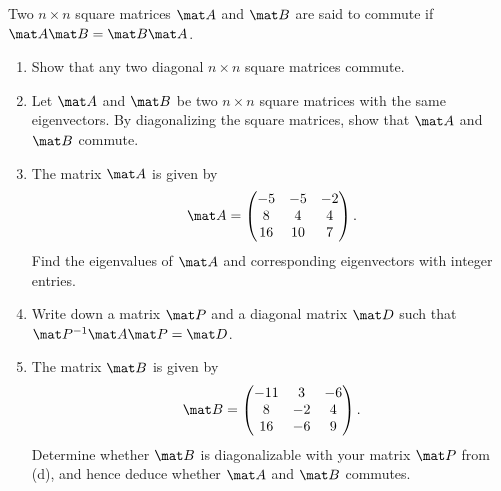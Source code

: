 \clearpage
\begin{problem}
    Two $n \times n$ square matrices $\mat A$ and $\mat B$ are said to commute if $\mat A \mat B = \mat B \mat A$.

    \begin{enumerate}
        \item Show that any two diagonal $n \times n$ square matrices commute.
        \item Let $\mat A$ and $\mat B$ be two $n \times n$ square matrices with the same eigenvectors. By diagonalizing the square matrices, show that $\mat A$ and $\mat B$ commute.
        \item The matrix $\mat A$ is given by \[\mat A = \begin{pmatrix}-5 & -5 & -2 \\ 8 & 4 & 4 \\ 16 & 10 & 7\end{pmatrix}.\] Find the eigenvalues of $\mat A$ and corresponding eigenvectors with integer entries.
        \item Write down a matrix $\mat P$ and a diagonal matrix $\mat D$ such that $\mat P^{-1} \mat A \mat P = \mat D$.
        \item The matrix $\mat B$ is given by \[\mat B = \begin{pmatrix}-11 & 3 & -6 \\ 8 & -2  & 4 \\ 16 & -6 & 9\end{pmatrix}.\] Determine whether $\mat B$ is diagonalizable with your matrix $\mat P$ from (d), and hence deduce whether $\mat A$ and $\mat B$ commutes.
    \end{enumerate}
\end{problem}
